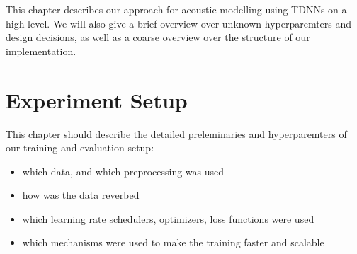 \label{ch:approach}
This chapter describes our approach for acoustic modelling using TDNNs on a high level. 
We will also give a brief overview over unknown hyperparemters and design decisions,
as well as a coarse overview over the structure of our implementation. 

\chapter{Experiment Setup}
\label{ch:experiment_setup}
This chapter should describe the detailed preleminaries and hyperparemters of our training and evaluation setup:
\begin{itemize}
    \item which data, and which preprocessing was used
    \item how was the data reverbed
    \item which learning rate schedulers, optimizers, loss functions were used
    \item which mechanisms were used to make the training faster and scalable
\end{itemize}